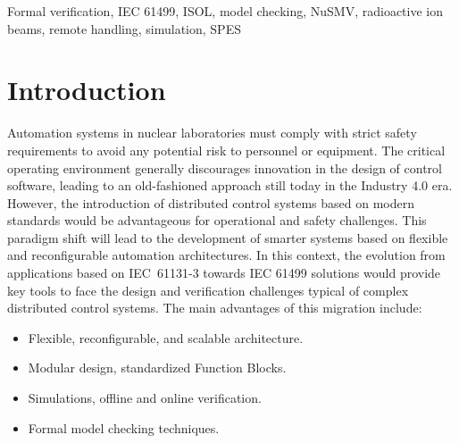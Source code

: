\documentclass{ieeeojies}
\begin{document}
\begin{keywords}
Formal verification, IEC 61499, ISOL, model checking, NuSMV, radioactive ion beams, remote handling, simulation, SPES
\end{keywords}

\titlepgskip=-15pt

\maketitle

\section{Introduction}
\label{sec:introduction}
Automation systems in nuclear laboratories must comply with strict safety requirements to avoid any potential risk to personnel or equipment.
The critical operating environment generally discourages innovation in the design of control software, leading to an old-fashioned approach still today in the Industry 4.0 era. However, the introduction of distributed control systems based on modern standards would be advantageous for operational and safety challenges. This paradigm shift will lead to the development of smarter systems based on flexible and reconfigurable automation architectures. In this context, the evolution from applications based on \mbox{IEC 61131-3} \cite{iec61131-3} towards IEC 61499 \cite{iec61499, zoitl2014} solutions would provide key tools to face the design and verification challenges typical of complex distributed control systems. 
The main advantages of this migration include:

\begin{itemize}
    \item Flexible, reconfigurable, and scalable architecture.
    \item Modular design, standardized Function Blocks.
    \item Simulations, offline and online verification. 
    \item Formal model checking techniques.
\end{itemize}
\end{document}
